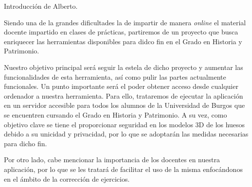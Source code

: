 
Introducción de Alberto.

Siendo una de la grandes dificultades la de impartir de manera \textit{online} el material docente impartido en clases de prácticas, partiremos de un proyecto que busca enriquecer las herramientas disponibles para didco fin en el Grado en Historia y Patrimonio.

Nuestro objetivo principal será seguir la estela de dicho proyecto y aumentar las funcionalidades de esta herramienta, así como pulir las partes actualmente funcionales. Un punto importante será el poder obtener acceso desde cualquier ordenador a nuestra herramienta. Para ello, trataremos de ejecutar la aplicación en un servidor accesible para todos los alumnos de la Universidad de Burgos que se encuentren cursando el Grado en Historia y Patrimonio. A su vez, como objetivo clave se tiene el proporcionar seguridad en los modelos 3D de los huesos debido a su unicidad y privacidad, por lo que se adoptarán las medidas necesarias para dicho fin.

Por otro lado, cabe mencionar la importancia de los docentes en nuestra aplicación, por lo que se les tratará de facilitar el uso de la misma enfocándonos en el ámbito de la corrección de ejercicios.
